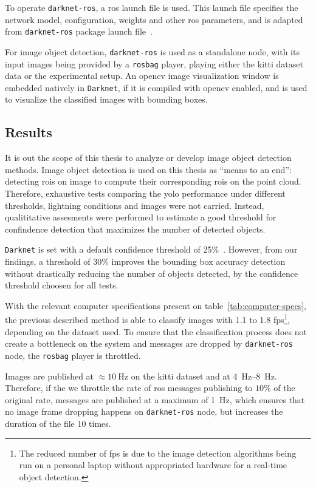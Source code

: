 To operate \texttt{darknet-ros}, a \ac{ros} launch file is used. This launch file specifies the network model, configuration, weights and other \ac{ros} parameters, and is adapted from \texttt{darknet-ros} package launch file~\cite{MarkoBjelonic}. 

For image object detection, \texttt{darknet-ros} is used as a standalone node, with its input images being provided by a \texttt{rosbag} player, playing either the \ac{kitti} dataset data or the experimental setup. An \ac{opencv} image visualization window is embedded natively in \texttt{Darknet}, if it is compiled with \ac{opencv} enabled, and is used to visualize the classified images with bounding boxes.


\subsection{Results}
\label{subsec:object-detection:image-results}
It is out the scope of this thesis to analyze or develop image object detection methods. Image object detection is used on this thesis as ``means to an end'': detecting \acp{roi} on image to compute their corresponding \acp{roi} on the point cloud. Therefore, exhaustive tests comparing the \ac{yolo} performance under different thresholds, lightning conditions and images were not carried. Instead, qualititative assesments were performed to estimate a good threshold for confindence detection that maximizes the number of detected objects.

\texttt{Darknet} is set with a default confidence threshold of 25\%~\cite{Redmon2016}. However, from our findings, a threshold of 30\% improves the bounding box accuracy detection without drastically reducing the number of objects detected, by the confidence threshold choosen for all tests.

With the relevant computer specifications present on table~\ref{tab:computer-specs}, the previous described method is able to classify images with 1.1 to 1.8 \ac{fps}\footnote{The reduced number of \ac{fps} is due to the image detection algorithms being run on a personal laptop without appropriated hardware for a real-time object detection.}, depending on the dataset used. To ensure that the classification process does not create a bottleneck on the system and messages are dropped by \texttt{darknet-ros} node, the \texttt{rosbag} player is throttled.

Images are published at $\approx\SI{10}{\hertz}$ on the \ac{kitti} dataset and at \SIrange[range-units=single]{4}{8}{\hertz}. Therefore, if the we throttle the rate of \ac{ros} messages publishing to $10\%$ of the original rate, messages are published at a maximum of \SI{1}{\hertz}, which ensures that no image frame dropping happens on \texttt{darknet-ros} node, but increases the duration of the file 10 times.

